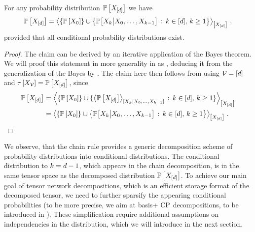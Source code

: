 \begin{theorem}
    \label{the:chainRule}
    For any probability distribution $\mathbb{P}\left[X_{[d]}\right]$ we have
    \begin{align*}
        \mathbb{P}\left[X_{[d]}\right]
        = \left\langle \{\mathbb{P}\left[X_{0}\right]\} \cup
        \left\{\mathbb{P}\big[X_{k}\big|X_{0},\ldots,X_{k-1}\big] \,:\, k\in[d] ,\, k\geq 1\right\}
        \right\rangle_{\left[ X_{[d]} \right]} \, ,
    \end{align*}
    provided that all conditional probability distributions exist.
\end{theorem}
\begin{proof}
    The claim can be derived by an iterative application of the Bayes  theorem.
    We will proof this statement in more generality in  as , deducing it from the generalization of the Bayes  by .
    The claim here then follows from  using $\mathcal{V}=[d]$ and $\tau\left[X_{\mathcal{V}}\right]=\mathbb{P}\left[X_{[d]}\right]$, since
    \begin{align*}
        \mathbb{P}\left[X_{[d]}\right]
        &= \left\langle \{\mathbb{P}\left[X_{0}\right]\} \cup
            \{\left\langle \mathbb{P}\left[X_{[d]}\right]\right\rangle_{\left[ X_{k} | X_{0},\ldots,X_{k-1} \right]}  \,:\, k\in[d] ,\, k\geq 1\}
        \right\rangle_{\left[ X_{[d]} \right]} \\
        &  = \left\langle \{\mathbb{P}\left[X_{0}\right]\} \cup
        \left\{\mathbb{P}\big[X_{k}\big|X_{0},\ldots,X_{k-1}\big] \,:\, k\in[d] ,\, k\geq 1\right\}
        \right\rangle_{\left[ X_{[d]} \right]} \, . \qedhere
    \end{align*}
\end{proof}

We observe, that the chain rule provides a generic decomposition scheme of probability distributions into conditional distributions.
The conditional distribution to $k=d-1$, which appears in the chain decomposition, is in the same tensor space as the decomposed distribution $\mathbb{P}\left[X_{[d]}\right]$.
To achieve our main goal of tensor network decompositions, which is an efficient storage format of the decomposed tensor, we need to further sparsify the appearing conditional probabilities (to be more precise, we aim at basis+ $\mathrm{CP}$ decompositions, to be introduced in ).
These simplification require additional assumptions on independencies in the distribution, which we will introduce in the next section.

